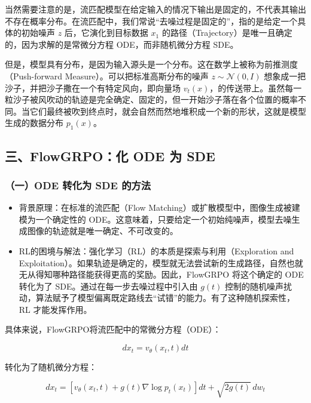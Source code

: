 当然需要注意的是，流匹配模型在给定输入的情况下输出是固定的，不代表其输出不存在概率分布。在流匹配中，我们常说``去噪过程是固定的''，指的是给定一个具体的初始噪声 \(z\) 后，它演化到目标数据 \(x_1\) 的路径（Trajectory）是唯一且确定的，因为求解的是常微分方程 ODE，而非随机微分方程 SDE。

但是，模型具有分布，是因为输入源头是一个分布。这在数学上被称为前推测度（Push-forward Measure）。可以把标准高斯分布的噪声 \(z\sim\mathcal{N}(0,I)\) 想象成一把沙子，并把沙子撒在一个有特定风向，即向量场 \(v_t(x)\)，的传送带上。虽然每一粒沙子被风吹动的轨迹是完全确定、固定的，但一开始沙子落在各个位置的概率不同。当它们最终被吹到终点时，就会自然而然地堆积成一个新的形状，这就是模型生成的数据分布 \(p_1(x)\)。

\hypertarget{ux4e09flowgrpoux5316-ode-ux4e3a-sde}{%
\subsection{三、FlowGRPO：化 ODE 为 SDE}\label{ux4e09flowgrpoux5316-ode-ux4e3a-sde}}

\hypertarget{ux4e00ode-ux8f6cux5316ux4e3a-sde-ux7684ux65b9ux6cd5}{%
\subsubsection{（一）ODE 转化为 SDE 的方法}\label{ux4e00ode-ux8f6cux5316ux4e3a-sde-ux7684ux65b9ux6cd5}}

\begin{itemize}
\tightlist
\item
  背景原理：在标准的流匹配（Flow Matching）或扩散模型中，图像生成被建模为一个确定性的 ODE。这意味着，只要给定一个初始纯噪声，模型去噪生成图像的轨迹就是唯一确定、不可改变的。
\item
  RL的困境与解法：强化学习（RL）的本质是探索与利用（Exploration and Exploitation）。如果轨迹是确定的，模型就无法尝试新的生成路径，自然也就无从得知哪种路径能获得更高的奖励。因此，FlowGRPO 将这个确定的 ODE 转化为了 SDE。通过在每一步去噪过程中引入由 \(g(t)\) 控制的随机噪声扰动，算法赋予了模型偏离既定路线去``试错''的能力。有了这种随机探索性，RL 才能发挥作用。
\end{itemize}

具体来说，FlowGRPO将流匹配中的常微分方程（ODE）：

\[
dx_t=v_\theta(x_t,t)dt
\]

转化为了随机微分方程：

\[
dx_t=\left[v_\theta(x_t,t)+g(t)\nabla\log p_t(x_t)\right]dt+\sqrt{2g(t)}\,dw_t
\]

